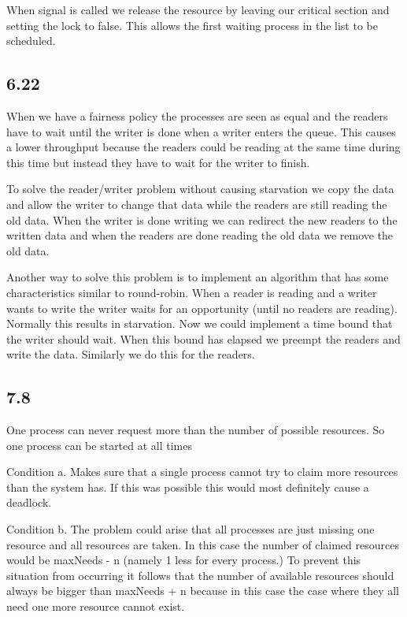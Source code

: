 \documentclass[]{article}
\begin{document}
When signal is called we release the resource by leaving our critical section and setting the lock to false. This allows the first waiting process in the list to be scheduled.\\

\subsection*{6.22}

When we have a fairness policy the processes are seen as equal and the readers have to wait until the writer is done when a writer enters the queue. This causes a lower throughput because the readers could be reading at the same time during this time but instead they have to wait for the writer to finish.

To solve the reader/writer problem without causing starvation we copy the data and allow the writer to change that data while the readers are still reading the old data. When the writer is done writing we can redirect the new readers to the written data and when the readers are done reading the old data we remove the old data.

Another way to solve this problem is to implement an algorithm that has some characteristics similar to round-robin. When a reader is reading and a writer wants to write the writer waits for an opportunity (until no readers are reading). Normally this results in starvation. Now we could implement a time bound that the writer should wait. When this bound has elapsed we preempt the readers and write the data. Similarly we do this for the readers.

\subsection*{7.8}

One process can never request more than the number of possible resources. So one process can be started at all times

Condition a. Makes sure that a single process cannot try to claim more resources than the system has. If this was possible this would most definitely cause a deadlock.

Condition b. The problem could arise that all processes are just missing one resource and all resources are taken. In this case the number of claimed resources would be maxNeeds - n (namely 1 less for every process.) To prevent this situation from occurring it follows that the number of available resources should always be bigger than maxNeeds + n because in this case the case where they all need one more resource cannot exist.
\end{document}
